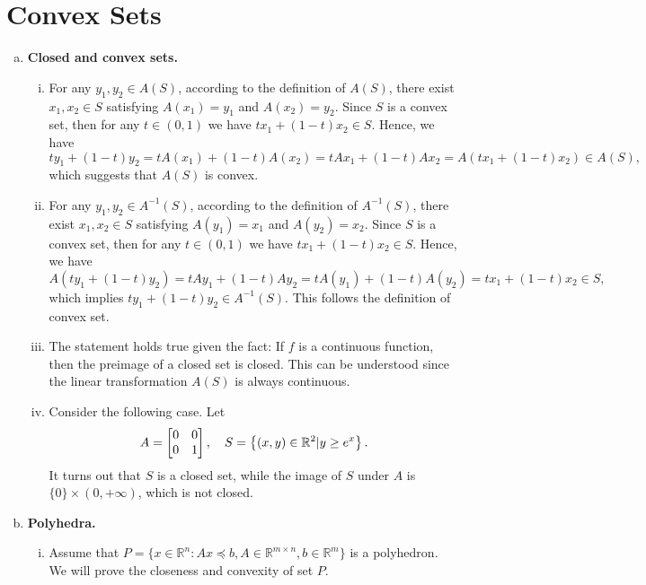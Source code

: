 \documentclass[12pt,letterpaper]{article}
\def\R{\mathbb{R}}
\begin{document}
	
	\section{Convex Sets}
	\begin{enumerate}[(a)]
	\item {\bf Closed and convex sets.}
	\begin{enumerate}[i.]
		\item For any $y_1, y_2 \in A(S)$, according to the definition of $A(S)$, there exist $x_1, x_2 \in S$ satisfying $A(x_1)=y_1$ and $A(x_2)=y_2$. Since $S$ is a convex set, then for any $t\in(0,1)$ we have $tx_1+(1-t)x_2\in S$. Hence, we have
		\begin{equation}
		ty_1 + (1-t)y_2 
		= tA(x_1) + (1-t)A(x_2)
		= tAx_1 + (1-t)Ax_2 
		= A(tx_1+(1-t)x_2) 
		\in A(S),
		\end{equation} 
		which suggests that $A(S)$ is convex.
		\item For any $y_1, y_2 \in A^{-1}(S)$, according to the definition of $A^{-1}(S)$, there exist $x_1, x_2 \in S$ satisfying $A(y_1)=x_1$ and $A(y_2)=x_2$. Since $S$ is a convex set, then for any $t\in(0,1)$ we have $tx_1+(1-t)x_2\in S$. Hence, we have
		\begin{equation}
		A(ty_1 + (1-t)y_2)
		= tAy_1 + (1-t)Ay_2
		= tA(y_1) + (1-t)A(y_2) 
		= tx_1+(1-t)x_2 
		\in S,
		\end{equation} 
		which implies $ty_1+(1-t)y_2\in A^{-1}(S)$. This follows the definition of convex set.
		
		\item The statement holds true given the fact: If $f$ is a continuous function, then the preimage of a closed set is closed. This can be understood since the linear transformation $A(S)$ is always continuous.
		
		\item Consider the following case. Let
		\begin{equation}
		A = \left[\begin{matrix}
		0 & 0 \cr
		0 & 1
		\end{matrix}\right],\quad
		S = \left\{(x,y) \in \R^2 |y\ge e^x\right\}.
		\end{equation}
		It turns out that $S$ is a closed set, while the image of $S$ under $A$ is $\{0\}\times (0,+\infty)$, which is not closed.
	\end{enumerate}

	\item {\bf Polyhedra.}
	\begin{enumerate}[i.]
		\item Assume that $P=\{x\in \R^n: Ax \preceq b, A\in \R^{m\times n}, b\in\R^m\}$ is a polyhedron. We will prove the closeness and convexity of set $P$.
		

\end{enumerate}
\end{enumerate}
\end{document}
